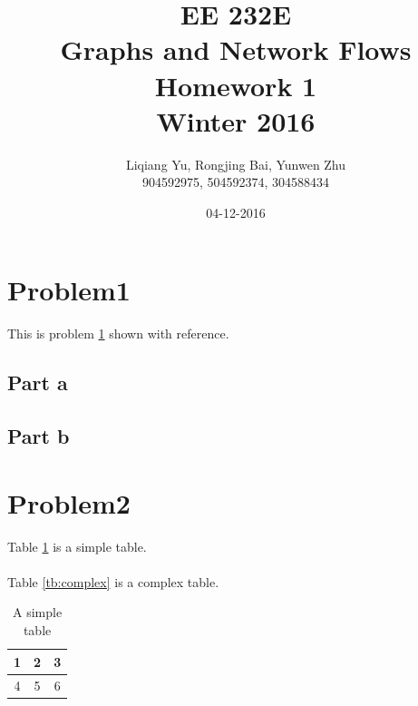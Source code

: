 \documentclass{article}
\begin{document}
\begin{titlepage}
\title{EE 232E \\Graphs and Network Flows\\Homework 1\\Winter 2016} 
\author{Liqiang Yu, Rongjing Bai, Yunwen Zhu\\
904592975, 504592374, 304588434}  %
\date{04-12-2016}
\end{titlepage}

\maketitle
\newpage
\tableofcontents
\newpage

\section{Problem1}\label{prob:p1}
This is problem \ref{prob:p1} shown with reference.
\subsection{Part a}
\subsection{Part b}

\section{Problem2}
Table \ref{tb:simple} is a simple table.\\
\\
Table \ref{tb:complex} is a complex table.
\begin {table}[htbp]
\caption{A simple table}
\begin{adjustbox}{center}
\label{tb:simple}
\begin{tabular}{|c|c|c|}
\hline
1&2&3\\
\hline
4&5&6\\
\hline
\end{tabular}
\end{adjustbox}
\end{table}
\end{document}
